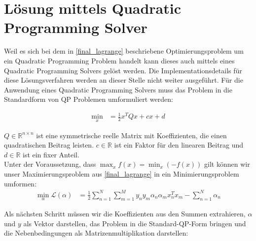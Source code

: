 \documentclass[a4paper,11pt,twoside]{scrreprt}
\newcommand{\Lagr}{\mathcal{L}}
\begin{document}
\section{Lösung mittels Quadratic Programming Solver} \label{sec:qp}

Weil es sich bei dem in \autoref{final_lagrange} beschriebene Optimierungsproblem um ein Quadratic Programming Problem handelt kann dieses auch mittels eines Quadratic Programming Solvers gelöst werden. Die Implementationsdetails für diese Lösungsverfahren werden an dieser Stelle nicht weiter ausgeführt. Für die Anwendung eines Quadratic Programming Solvers muss das Problem in die Standardform von \ac{QP} Problemen umformuliert werden:

\begin{equation} \label{std_QP_problem}
	\begin{aligned}
		\min_{x} &= \frac{1}{2} x^{T} Q x + c x + d 
	\end{aligned}
\end{equation}

$Q \in \mathbb{R}^{n \times n}$ ist eine symmetrische reelle Matrix mit Koeffizienten, die einen quadratischen Beitrag leisten. $c \in \mathbb{R}$ ist ein Faktor für den linearen Beitrag und $d \in \mathbb{R}$ ist ein fixer Anteil. \\

Unter der Voraussetzung, dass $\max_{x} f(x) = \min_{x} (-f(x))$ gilt können wir unser Maximierungsproblem aus \autoref{final_lagrange} in ein Minimierungsproblem umformen:
\begin{equation} \label{qp_adapt1}
	\begin{aligned}
		\min_{\alpha} \Lagr(\alpha) &= \frac{1}{2} \sum_{n=1}^{N} \sum_{m=1}^{M} y_{n} y_{m} \alpha_{n} \alpha_{m} x_{n}^{T} x_{m} - \sum_{n=1}^{N} \alpha_{n}
	\end{aligned}
\end{equation}

Als nächsten Schritt müssen wir die Koeffizienten aus den Summen extrahieren, $\alpha$ und $y$ als Vektor darstellen, das Problem in die Standard-QP-Form bringen und die Nebenbedingungen als Matrizenmultiplikation darstellen:
\end{document}

